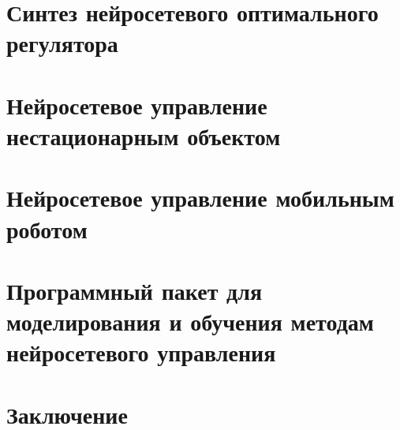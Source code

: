 \documentclass[12pt]{rusthesis}
\begin{document}
\chapter{Синтез нейросетевого оптимального регулятора}
%

\chapter{Нейросетевое управление нестационарным объектом}


\chapter{Нейросетевое управление мобильным роботом}


\chapter{Программный пакет для моделирования и обучения методам нейросетевого управления}


\chapter*{Заключение}




%

%
\end{document}
